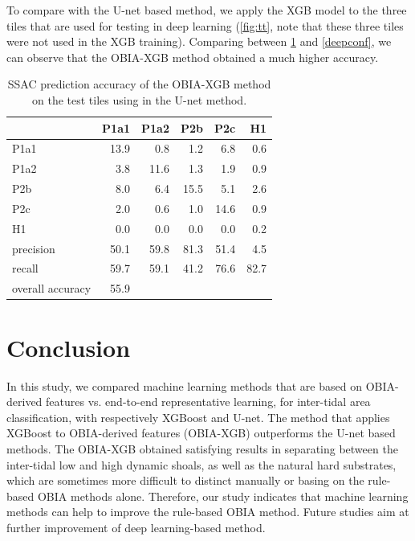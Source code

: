 \documentclass{isprs} %
\begin{document}
To compare with the U-net based method, we apply the XGB model to the three tiles that are used for testing in deep learning (\cref{fig:tt}, note that these three tiles were not used in the XGB training). Comparing between \cref{tab:xgb_unettile} and \cref{deepconf}, we can observe that the OBIA-XGB method obtained a much higher accuracy. 

\begin{table}[]
    \centering
\begin{tabular}{lrrrrr}
\toprule
{} &  P1a1 &  P1a2 &  P2b &  P2c &   H1 \\
\midrule
P1a1             &  13.9 &   0.8 &  1.2 &  6.8 &  0.6 \\
P1a2             &   3.8 &  11.6 &  1.3 &  1.9 &  0.9 \\
P2b              &   8.0 &   6.4 & 15.5 &  5.1 &  2.6 \\
P2c              &   2.0 &   0.6 &  1.0 & 14.6 &  0.9 \\
H1               &   0.0 &   0.0 &  0.0 &  0.0 &  0.2 \\
precision        &  50.1 &  59.8 & 81.3 & 51.4 &  4.5 \\
recall           &  59.7 &  59.1 & 41.2 & 76.6 & 82.7 \\
overall accuracy &  55.9 &       &      &      &      \\
\bottomrule
\end{tabular}
    \caption{SSAC prediction accuracy of the OBIA-XGB method on the test tiles using in the U-net method. }
    \label{tab:xgb_unettile}
\end{table}
 
 
\section{Conclusion}

In this study, we compared machine learning methods that are based on OBIA-derived features vs. end-to-end representative learning, for inter-tidal area classification, with respectively XGBoost and U-net. The method that applies XGBoost to OBIA-derived features (OBIA-XGB) outperforms the U-net based methods. The OBIA-XGB obtained satisfying results in separating between the inter-tidal low and high dynamic shoals, as well as the natural hard substrates, which are sometimes more difficult to distinct manually or basing on the rule-based OBIA methods alone. Therefore, our study indicates that machine learning methods can help to improve the rule-based OBIA method. Future studies aim at further improvement of deep learning-based method.
\end{document}

